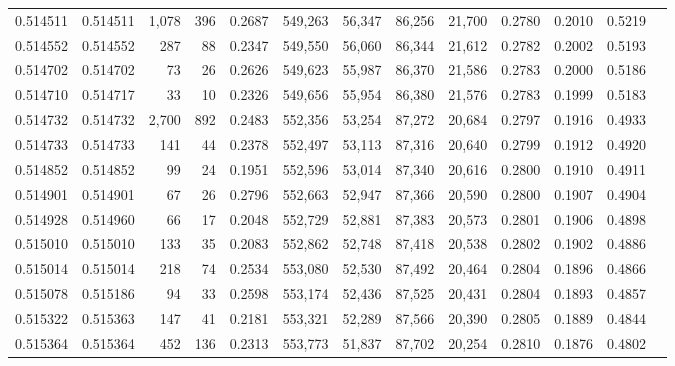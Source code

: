 \begin{tabular}{rrrrrrrrrrrrr}
0.514511 & 0.514511 & 1,078 &   396 &                                     0.2687 & 549,263 &  56,347 &  86,256 &  21,700 & 0.2780 & 0.2010 & 0.5219 \\
0.514552 & 0.514552 &   287 &    88 &                                     0.2347 & 549,550 &  56,060 &  86,344 &  21,612 & 0.2782 & 0.2002 & 0.5193 \\
0.514702 & 0.514702 &    73 &    26 &                                     0.2626 & 549,623 &  55,987 &  86,370 &  21,586 & 0.2783 & 0.2000 & 0.5186 \\
0.514710 & 0.514717 &    33 &    10 &                                     0.2326 & 549,656 &  55,954 &  86,380 &  21,576 & 0.2783 & 0.1999 & 0.5183 \\
0.514732 & 0.514732 & 2,700 &   892 &                                     0.2483 & 552,356 &  53,254 &  87,272 &  20,684 & 0.2797 & 0.1916 & 0.4933 \\
0.514733 & 0.514733 &   141 &    44 &                                     0.2378 & 552,497 &  53,113 &  87,316 &  20,640 & 0.2799 & 0.1912 & 0.4920 \\
0.514852 & 0.514852 &    99 &    24 &                                     0.1951 & 552,596 &  53,014 &  87,340 &  20,616 & 0.2800 & 0.1910 & 0.4911 \\
0.514901 & 0.514901 &    67 &    26 &                                     0.2796 & 552,663 &  52,947 &  87,366 &  20,590 & 0.2800 & 0.1907 & 0.4904 \\
0.514928 & 0.514960 &    66 &    17 &                                     0.2048 & 552,729 &  52,881 &  87,383 &  20,573 & 0.2801 & 0.1906 & 0.4898 \\
0.515010 & 0.515010 &   133 &    35 &                                     0.2083 & 552,862 &  52,748 &  87,418 &  20,538 & 0.2802 & 0.1902 & 0.4886 \\
0.515014 & 0.515014 &   218 &    74 &                                     0.2534 & 553,080 &  52,530 &  87,492 &  20,464 & 0.2804 & 0.1896 & 0.4866 \\
0.515078 & 0.515186 &    94 &    33 &                                     0.2598 & 553,174 &  52,436 &  87,525 &  20,431 & 0.2804 & 0.1893 & 0.4857 \\
0.515322 & 0.515363 &   147 &    41 &                                     0.2181 & 553,321 &  52,289 &  87,566 &  20,390 & 0.2805 & 0.1889 & 0.4844 \\
0.515364 & 0.515364 &   452 &   136 &                                     0.2313 & 553,773 &  51,837 &  87,702 &  20,254 & 0.2810 & 0.1876 & 0.4802 \\

\end{tabular}
